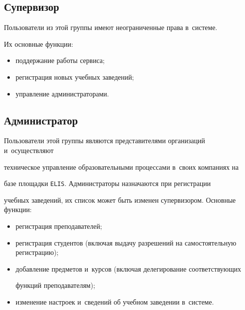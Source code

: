 \subsection{Супервизор}





\vspace*{-3pt}





Пользователи из этой группы имеют неограниченные права в~системе. 


Их основные функции:


\begin{itemize}


\item поддержание работы сервиса;


\item регистрация новых учебных заведений;


\item управление администраторами.


\end{itemize}





\vspace*{-3pt}





\subsection{Администратор}





\vspace*{-3pt}





Пользователи этой группы являются представителями организаций и~осуществляют


 техническое управление образовательными процессами в~своих компаниях на 


 базе площадки \verb"ELIS". Администраторы назначаются при регистрации 


 учебных заведений, их список может быть изменен супервизором. Основные функции:


\begin{itemize}


\item регистрация преподавателей;


\item регистрация студентов (включая выдачу разрешений на самостоятельную регистрацию);


\item добавление предметов и~курсов (включая делегирование соответствующих 


функций преподавателям);


\item изменение настроек и~сведений об учебном заведении в~системе.


\end{itemize}





